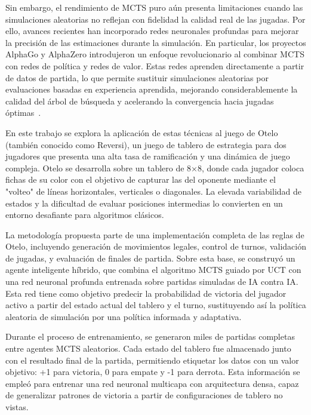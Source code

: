 \documentclass[conference,a4paper]{IEEEtran}
\begin{document}
Sin embargo, el rendimiento de MCTS puro aún presenta limitaciones cuando las simulaciones aleatorias no reflejan con fidelidad la calidad real de las jugadas. Por ello, avances recientes han incorporado redes neuronales profundas para mejorar la precisión de las estimaciones durante la simulación. En particular, los proyectos AlphaGo y AlphaZero introdujeron un enfoque revolucionario al combinar MCTS con redes de política y redes de valor. Estas redes aprenden directamente a partir de datos de partida, lo que permite sustituir simulaciones aleatorias por evaluaciones basadas en experiencia aprendida, mejorando considerablemente la calidad del árbol de búsqueda y acelerando la convergencia hacia jugadas óptimas~\cite{b4}.

En este trabajo se explora la aplicación de estas técnicas al juego de Otelo (también conocido como Reversi), un juego de tablero de estrategia para dos jugadores que presenta una alta tasa de ramificación y una dinámica de juego compleja. Otelo se desarrolla sobre un tablero de 8×8, donde cada jugador coloca fichas de su color con el objetivo de capturar las del oponente mediante el "volteo" de líneas horizontales, verticales o diagonales. La elevada variabilidad de estados y la dificultad de evaluar posiciones intermedias lo convierten en un entorno desafiante para algoritmos clásicos.

La metodología propuesta parte de una implementación completa de las reglas de Otelo, incluyendo generación de movimientos legales, control de turnos, validación de jugadas, y evaluación de finales de partida. Sobre esta base, se construyó un agente inteligente híbrido, que combina el algoritmo MCTS guiado por UCT con una red neuronal profunda entrenada sobre partidas simuladas de IA contra IA. Esta red tiene como objetivo predecir la probabilidad de victoria del jugador activo a partir del estado actual del tablero y el turno, sustituyendo así la política aleatoria de simulación por una política informada y adaptativa.

Durante el proceso de entrenamiento, se generaron miles de partidas completas entre agentes MCTS aleatorios. Cada estado del tablero fue almacenado junto con el resultado final de la partida, permitiendo etiquetar los datos con un valor objetivo: +1 para victoria, 0 para empate y -1 para derrota. Esta información se empleó para entrenar una red neuronal multicapa con arquitectura densa, capaz de generalizar patrones de victoria a partir de configuraciones de tablero no vistas.
\end{document}

